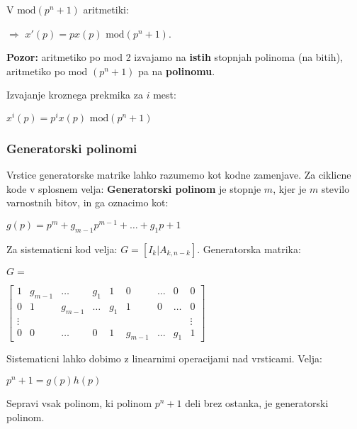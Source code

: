 \documentclass{article}
\begin{document}
\begin{multicols}{4}
V $\text{mod}(p^n + 1)$ aritmetiki:
\begin{center}
    $\Rightarrow$ $x'(p) = px(p) \text{ mod}(p^n + 1)$.
\end{center}

\textbf{Pozor:} aritmetiko po mod 2 izvajamo na \textbf{istih} stopnjah polinoma (na bitih), aritmetiko
po mod $(p^n + 1)$ pa na \textbf{polinomu}.

Izvajanje kroznega prekmika za $i$ mest:
\begin{center}
    \begin{math}
        x^i(p) = p^i x(p) \text{ mod} (p^n + 1)
    \end{math}
\end{center}

\subsubsection{Generatorski polinomi}
Vrstice generatorske matrike lahko razumemo kot kodne zamenjave.
Za ciklicne kode v splosnem velja: \textbf{Generatorski polinom} je stopnje $m$, kjer je $m$ stevilo
varnostnih bitov, in ga oznacimo kot:
\begin{center}
    \begin{math}
        g(p) = p^m + g_{m-1}p^{m-1} + \dots + g_1p + 1
    \end{math}
\end{center}
Za sistematicni kod velja: $G = [I_k | A_{k, n-k}]$.
Generatorska matrika:
\begin{center}
    $G= $
    \begin{tiny}
        \begin{math}
            \begin{bmatrix}
                1 & g_{m - 1} &  \dots & g_1 & 1 & 0 & \dots & 0 & 0 \\
                0 & 1         & g_{m-1} & \dots & g_1 & 1 & 0 & \dots & 0 \\
                \vdots & & & & & & & & \vdots  \\
                0 & 0 & \dots & 0 & 1 & g_{m-1} & \dots & g_1 & 1
            \end{bmatrix}
        \end{math}
    \end{tiny}
\end{center}
Sistematicni lahko dobimo z linearnimi operacijami nad vrsticami.
Velja:
\begin{center}
    \begin{math}
        p^n + 1 = g(p)h(p)
    \end{math}
\end{center}
Sepravi vsak polinom, ki polinom $p^n + 1$ deli brez ostanka, je generatorski polinom.


\end{multicols}
\end{document}
